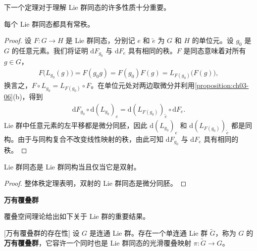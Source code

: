 \documentclass[../../main.tex]{subfiles}
\begin{document}
下一个定理对于理解 Lie 群同态的许多性质十分重要。

\begin{theorem}\label{theorem:ch07-05}
每个 Lie 群同态都具有常秩。
\end{theorem}

\begin{proof}
设 $F\colon G\to H$ 是 Lie 群同态，分别记 $e$ 和 $\tilde{e}$ 为 $G$ 和 $H$ 的单位元。设 $g_0$ 是 $G$ 的任意元素。我们将证明 $\mathrm{d}F_{g_0}$ 与 $\mathrm{d}F_e$ 具有相同的秩。$F$ 是同态意味着对所有 $g\in G$，
\begin{align*}
F\bigl(L_{g_0}(g)\bigr)=F(g_0g)=F(g_0)F(g)=L_{F(g_0)}\bigl(F(g)\bigr),
\end{align*}
换言之，$F\circ L_{g_0}=L_{F(g_0)}\circ F$。在单位元处对两边取微分并利用\cref{proposition:ch03-06}(b)，得到
\begin{align*}
\mathrm{d}F_{g_0}\circ\mathrm{d}(L_{g_0})_e=\mathrm{d}(L_{F(g_0)})_{\tilde{e}}\circ\mathrm{d}F_e.
\end{align*}
Lie 群中任意元素的左平移都是微分同胚，因此 $\mathrm{d}(L_{g_0})_e$ 和 $\mathrm{d}(L_{F(g_0)})_{\tilde{e}}$ 都是同构。由于与同构复合不改变线性映射的秩，由此可知 $\mathrm{d}F_{g_0}$ 与 $\mathrm{d}F_e$ 具有相同的秩。
\end{proof}

\begin{corollary}\label{corollary:ch07-06}
Lie 群同态是 Lie 群同构当且仅当它是双射。
\end{corollary}

\begin{proof}
整体秩定理表明，双射的 Lie 群同态是微分同胚。
\end{proof}

\textbf{万有覆叠群}

覆叠空间理论给出如下关于 Lie 群的重要结果。

\begin{theorem}\label{theorem:ch07-07}[万有覆叠群的存在性]
设 $G$ 是连通 Lie 群。存在一个单连通 Lie 群 $\widetilde{G}$，称为 $G$ 的\textbf{万有覆叠群}，它容许一个同时也是 Lie 群同态的光滑覆叠映射 $\pi\colon\widetilde{G}\to G$。
\end{theorem}
\end{document}
